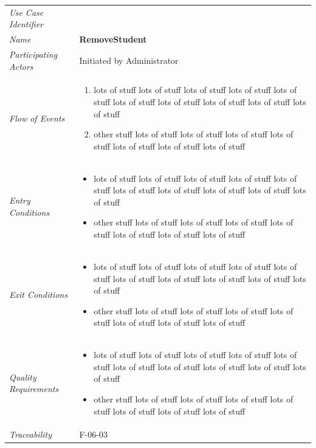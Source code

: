 \documentclass[12pt,letterpaper]{article}
\begin{document}
\begin{center}
	\begin{tabu} to 
		\toprule
		Use Case Identifier & \removestudent{} \\
		Name & {\bf RemoveStudent} \\
		Participating Actors & Initiated by Administrator \\
		Flow of Events & 
	    \begin{enumerate}[topsep=-1em]
		    \item lots of stuff lots of stuff lots of stuff lots of stuff lots of stuff lots of stuff lots of stuff lots of stuff lots of stuff lots of stuff
		    \item other stuff lots of stuff lots of stuff lots of stuff lots of stuff lots of stuff lots of stuff lots of stuff
		\end{enumerate} \\

		Entry Conditions &
		\begin{itemize}[topsep=-1em]
		    \item lots of stuff lots of stuff lots of stuff lots of stuff lots of stuff lots of stuff lots of stuff lots of stuff lots of stuff lots of stuff
		    \item other stuff lots of stuff lots of stuff lots of stuff lots of stuff lots of stuff lots of stuff lots of stuff
        \end{itemize} \\

		Exit Conditions &
		\begin{itemize}[topsep=-1em]
		    \item lots of stuff lots of stuff lots of stuff lots of stuff lots of stuff lots of stuff lots of stuff lots of stuff lots of stuff lots of stuff
		    \item other stuff lots of stuff lots of stuff lots of stuff lots of stuff lots of stuff lots of stuff lots of stuff
        \end{itemize} \\

		Quality Requirements &
		\begin{itemize}[topsep=-1em]
		    \item lots of stuff lots of stuff lots of stuff lots of stuff lots of stuff lots of stuff lots of stuff lots of stuff lots of stuff lots of stuff
		    \item other stuff lots of stuff lots of stuff lots of stuff lots of stuff lots of stuff lots of stuff lots of stuff
        \end{itemize} \\

		Traceability & F-06-03 \\
		\toprule
	\end{tabu}
\end{center}
\end{document}
